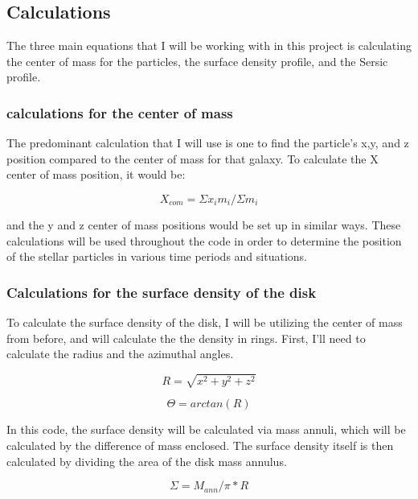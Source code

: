 \documentclass[twocolumn]{aastex63}
\begin{document}
\subsection{Calculations}
The three main equations that I will be working with in this project is calculating the center of mass for the particles, the surface density profile, and the Sersic profile. 

\subsubsection{calculations for the center of mass}

The predominant calculation that I will use is one to find the particle's x,y, and z position compared to the center of mass for that galaxy. To calculate the X center of mass position, it would be:

\begin{equation}
    X_{com} = \Sigma x_{i}m_{i}/ \Sigma m_{i}
\end{equation}

and the y and z center of mass positions would be set up in similar ways. These calculations will be used throughout the code in order to determine the position of the stellar particles in various time periods and situations. 

\subsubsection{Calculations for the surface density of the disk}

To calculate the surface density of the disk, I will be utilizing the center of mass from before, and will calculate the the density in rings. First, I'll need to calculate the radius and the azimuthal angles.

\begin{equation}
    R =\sqrt{x^2+y^2+z^2}
\end{equation}

\begin{equation}
    \Theta = arctan(R)
\end{equation}

In this code, the surface density will be calculated via mass annuli, which will be calculated by the difference of mass enclosed. The surface density itself is then calculated by dividing the area of the disk mass annulus. 

\begin{equation}
    \Sigma = M_{ann}/\pi*R
\end{equation}
\end{document}
